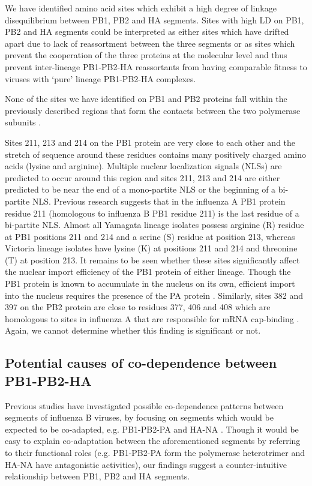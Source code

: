 \documentclass[11pt,oneside,letterpaper]{article}
\begin{document}
We have identified amino acid sites which exhibit a high degree of linkage disequilibrium between PB1, PB2 and HA segments.
Sites with high LD on PB1, PB2 and HA segments could be interpreted as either sites which have drifted apart due to lack of reassortment between the three segments or as sites which prevent the cooperation of the three proteins at the molecular level and thus prevent inter-lineage PB1-PB2-HA reassortants from having comparable fitness to viruses with `pure' lineage PB1-PB2-HA complexes.

None of the sites we have identified on PB1 and PB2 proteins fall within the previously described regions that form the contacts between the two polymerase subunits \cite{sugiyama2009}.

Sites 211, 213 and 214 on the PB1 protein are very close to each other and the stretch of sequence around these residues contains many positively charged amino acids (lysine and arginine).
Multiple nuclear localization signals (NLSs) are predicted to occur around this region and sites 211, 213 and 214 are either predicted to be near the end of a mono-partite NLS or the beginning of a bi-partite NLS.
Previous research \cite{nath1990} suggests that in the influenza A PB1 protein residue 211 (homologous to influenza B PB1 residue 211) is the last residue of a bi-partite NLS.
Almost all Yamagata lineage isolates possess arginine (R) residue at PB1 positions 211 and 214 and a serine (S) residue at position 213, whereas Victoria lineage isolates have lysine (K) at positions 211 and 214 and threonine (T) at position 213.
It remains to be seen whether these sites significantly affect the nuclear import efficiency of the PB1 protein of either lineage.
Though the PB1 protein is known to accumulate in the nucleus on its own, efficient import into the nucleus requires the presence of the PA protein \cite{fodor2004}.
Similarly, sites 382 and 397 on the PB2 protein are close to residues 377, 406 and 408 which are homologous to sites in influenza A that are responsible for mRNA cap-binding \cite{guilligay2008}.
Again, we cannot determine whether this finding is significant or not.

\subsection*{Potential causes of co-dependence between PB1-PB2-HA}
Previous studies have investigated possible co-dependence patterns between segments of influenza B viruses, by focusing on segments which would be expected to be co-adapted, e.g. PB1-PB2-PA and HA-NA \cite{mccullers2004}.
Though it would be easy to explain co-adaptation between the aforementioned segments by referring to their functional roles (e.g. PB1-PB2-PA form the polymerase heterotrimer and HA-NA have antagonistic activities), our findings suggest a counter-intuitive relationship between PB1, PB2 and HA segments.
\end{document}

